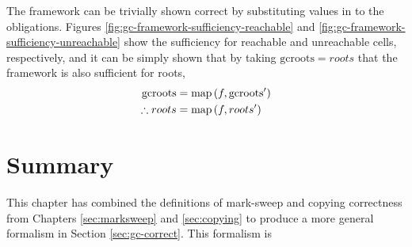 The framework can be trivially shown correct by substituting values in
to the obligations. Figures
\ref{fig:gc-framework-sufficiency-reachable} and
\ref{fig:gc-framework-sufficiency-unreachable} show the sufficiency
for reachable and unreachable cells, respectively, and it can be
simply shown that by taking $\mathrm{gcroots} = roots$ that the
framework is also sufficient for roots,
\begin{align*}
  \mathrm{gcroots} &= \mathrm{map}\left(f, \mathrm{gcroots'}\right)\\
  \therefore roots &= \mathrm{map}\left(f, roots'\right)
\end{align*}

\section{Summary}
\label{sec:gc-summary}

This chapter has combined the definitions of mark-sweep and copying
correctness from Chapters \ref{sec:marksweep} and \ref{sec:copying} to
produce a more general formalism in Section \ref{sec:gc-correct}. This
formalism is

